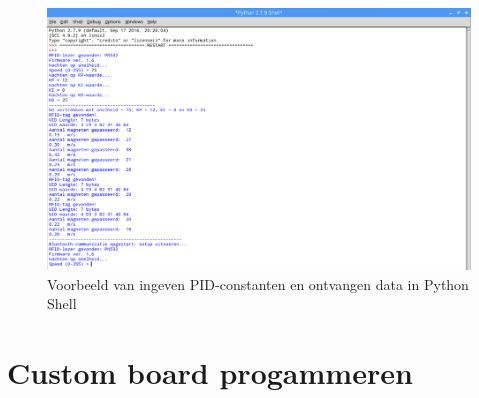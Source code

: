 \begin{figure}[H]
	\centering
	\includegraphics[width=\textwidth]{bluetoothoutputvoorbeeldbijgesneden.png}
	\caption{Voorbeeld van ingeven PID-constanten en ontvangen data in Python Shell\label{fig:bluetoothoutput}}
\end{figure}

\section{Custom board progammeren}
